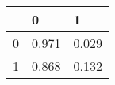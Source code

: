 \begin{table}
\label{tbl:dna_dtm}
\begin{tabular}{lll}
\toprule
 & 0 & 1 \\
\midrule
0 & 0.971 & 0.029 \\
1 & 0.868 & 0.132 \\
\bottomrule
\end{tabular}
\end{table}
